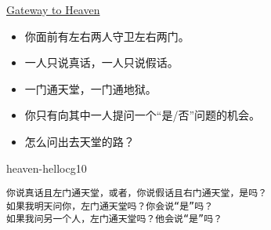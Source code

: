 \documentclass[aspectratio=43,11pt,UTF8,colorlinks,compress]{beamer} %
\begin{document}

\begin{frame}[fragile]{\href{https://dbfin.com/logic/enderton/chapter-1/section-1-2-truth-assignments/problem-7-solution/}{\textcolor{fore}{Gateway to Heaven}}}
	\begin{problem}
		\begin{itemize}
			\item 你面前有左右两人守卫左右两门。
			\item 一人只说真话，一人只说假话。
			\item 一门通天堂，一门通地狱。
			\item 你只有向其中一人提问一个“是/否”问题的机会。
			\item 怎么问出去天堂的路？
		\end{itemize}
	\end{problem}
\begin{ocg}{heaven-hell}{ocg1}{0}
\begin{verbatim}
你说真话且左门通天堂，或者，你说假话且右门通天堂，是吗？
如果我明天问你，左门通天堂吗？你会说“是”吗？
如果我问另一个人，左门通天堂吗？他会说“是”吗？
\end{verbatim}
\end{ocg}
\end{frame}
\end{document}
